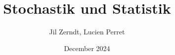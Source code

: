\documentclass[a4paper, fontsize = 8pt, landscape]{scrartcl}
\title{Stochastik und Statistik}
\author{Jil Zerndt, Lucien Perret}
\date{December 2024}
\begin{document}
\begin{multicols}{3}
	\thispagestyle{TitlePageStyle}
	\maketitle
	
	
	
	
	
	
	
	\raggedcolumns
	\pagebreak
	
	\raggedcolumns
\end{multicols}
\end{document}
